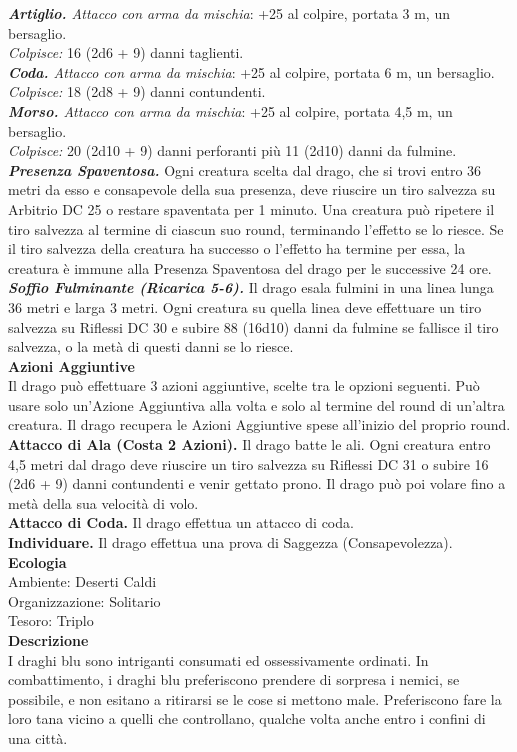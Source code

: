 \begin{multicols}{2}
\emph{\textbf{Artiglio.} Attacco con arma da mischia}: +25 al colpire, portata 3 m, un bersaglio.\\
\emph{Colpisce:} 16 (2d6 + 9) danni taglienti.\\
\emph{\textbf{Coda.} Attacco con arma da mischia}: +25 al colpire, portata 6 m, un bersaglio.\\
\emph{Colpisce:} 18 (2d8 + 9) danni contundenti.\\
\emph{\textbf{Morso.} Attacco con arma da mischia}: +25 al colpire, portata 4,5 m, un bersaglio.\\
\emph{Colpisce:} 20 (2d10 + 9) danni perforanti più 11 (2d10) danni da fulmine.\\
\emph{\textbf{Presenza Spaventosa.}} Ogni creatura scelta dal drago, che si trovi entro 36 metri da esso e consapevole della sua presenza, deve riuscire un tiro salvezza su Arbitrio DC  25 o restare spaventata per 1 minuto. Una creatura può ripetere il tiro salvezza al termine di ciascun suo round, terminando l'effetto se lo riesce. Se il tiro salvezza della creatura ha successo o l'effetto ha termine per essa, la creatura è immune alla Presenza Spaventosa del drago per le successive 24 ore.\\
\emph{\textbf{Soffio Fulminante (Ricarica 5-6).}} Il drago esala fulmini in una linea lunga 36 metri e larga 3 metri. Ogni creatura su quella linea deve effettuare un tiro salvezza su Riflessi DC  30 e subire 88 (16d10) danni da fulmine se fallisce il tiro salvezza, o la metà di questi danni se lo riesce.\\
\textbf{Azioni Aggiuntive}\\
Il drago può effettuare 3 azioni aggiuntive, scelte tra le opzioni seguenti. Può usare solo un'Azione Aggiuntiva alla volta e solo al termine del round di un'altra creatura. Il drago recupera le Azioni Aggiuntive spese all'inizio del proprio round.\\
\textbf{Attacco di Ala (Costa 2 Azioni).} Il drago batte le ali. Ogni creatura entro 4,5 metri dal drago deve riuscire un tiro salvezza su Riflessi DC  31 o subire 16 (2d6 + 9) danni contundenti e venir gettato prono. Il drago può poi volare fino a metà della sua velocità di volo.\\
\textbf{Attacco di Coda.} Il drago effettua un attacco di coda.\\
\textbf{Individuare.} Il drago effettua una prova di Saggezza (Consapevolezza).\\
\textbf{Ecologia}\\
Ambiente: Deserti Caldi\\
Organizzazione: Solitario\\
Tesoro: Triplo\\
\textbf{Descrizione}\\
I draghi blu sono intriganti consumati ed ossessivamente ordinati. In combattimento, i draghi blu preferiscono prendere di sorpresa i nemici, se possibile, e non esitano a ritirarsi se le cose si mettono male. Preferiscono fare la loro tana vicino a quelli che controllano, qualche volta anche entro i confini di una città.\\


\end{multicols}
